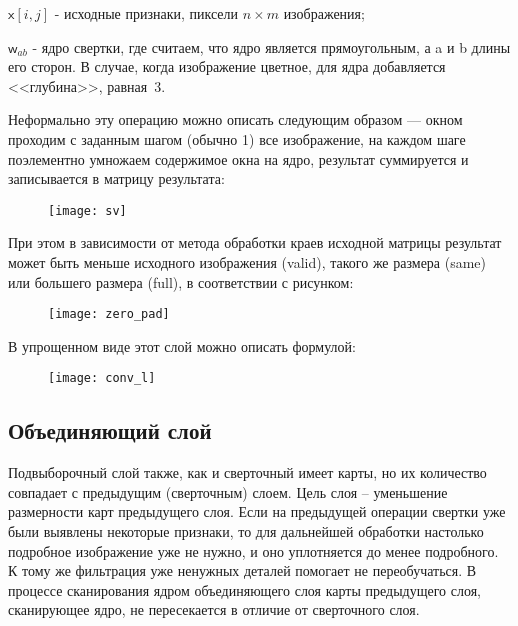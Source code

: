 \documentclass[11pt,colorlinks=true]{article}
\begin{document}
$\mathsf{x}[i,j]$ - исходные признаки, пиксели $n \times m$ изображения; 

$\mathsf{w}_{ab}$ - ядро свертки, где считаем, что ядро является прямоугольным, а a и b длины его сторон. В случае, когда изображение цветное, для ядра добавляется <<глубина>>, равная~3.

Неформально эту операцию можно описать следующим образом — окном проходим с заданным шагом (обычно 1) все изображение, на каждом шаге поэлементно умножаем содержимое окна на ядро, результат суммируется и записывается в матрицу результата:

\begin{figure}[h]
	\begin{center}
		\begin{minipage}[h]{1\linewidth}
			\texttt{[image: sv]}
		\end{minipage}
	\end{center}
\end{figure}

При этом в зависимости от метода обработки краев исходной матрицы результат может быть меньше исходного изображения (valid), такого же размера (same) или большего размера (full), в соответствии с рисунком:

\begin{figure}[h]
	\begin{center}
		\begin{minipage}[h]{1\linewidth}
			\texttt{[image: zero\_pad]}
		\end{minipage}
	\end{center}
\end{figure}

В упрощенном виде этот слой можно описать формулой: 
\begin{figure}[h]
	\begin{center}
		\begin{minipage}[h]{1\linewidth}
			\texttt{[image: conv\_l]}
		\end{minipage}
	\end{center}
\end{figure}



\newpage
\subsection{Объединяющий слой}

Подвыборочный слой также, как и сверточный имеет карты, но их количество совпадает с предыдущим (сверточным) слоем. Цель слоя – уменьшение размерности карт предыдущего слоя. Если на предыдущей операции свертки уже были выявлены некоторые признаки, то для дальнейшей обработки настолько подробное изображение уже не нужно, и оно уплотняется до менее подробного. К тому же фильтрация уже ненужных деталей помогает не переобучаться. 
В процессе сканирования ядром объединяющего слоя карты предыдущего слоя, сканирующее ядро, не пересекается в отличие от сверточного слоя. 
\end{document}
